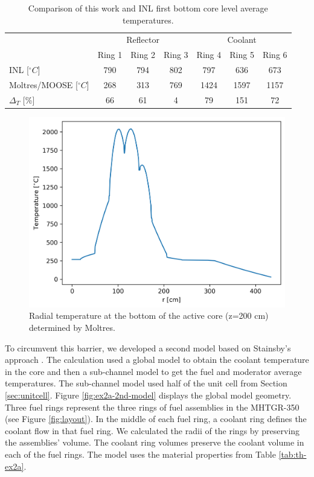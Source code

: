 \begin{table}[htbp!]
\centering
      \caption{Comparison of this work and INL \cite{strydom_inl_2013} first bottom core level average temperatures.}
      \label{tab:th-ex2a-1st-results}
\begin{tabular}{l|ccc|ccc}
    \toprule
                & \multicolumn{3}{c|}{Reflector} & \multicolumn{3}{c}{Coolant} \\ \cline{2-7} 
                & Ring 1   & Ring 2   & Ring 3   & Ring 4   & Ring 5  & Ring 6  \\
    \midrule
INL [$^{\circ}C$]           & 790    & 794     & 802     & 797     & 636     & 673     \\
Moltres/MOOSE [$^{\circ}C$] & 268    & 313     & 769     & 1424    & 1597    & 1157    \\
$\Delta_T$ [\%]    & 66       & 61     & 4       & 79      & 151     & 72      \\
    \bottomrule
  \end{tabular}
\end{table}

\begin{figure}[htbp!]
  \centering
  \includegraphics[width=0.45\linewidth]{figures-thermal/ex2a-across}
  \hfill
  \caption{Radial temperature at the bottom of the active core (z=200 cm) determined by Moltres.}
  \label{fig:ex2a-1st-model-across}
\end{figure}

To circumvent this barrier, we developed a second model based on Stainsby's approach \cite{stainsby_investigation_2008}.
The calculation used a global model to obtain the coolant temperature in the core and then a sub-channel model to get the fuel and moderator average temperatures.
The sub-channel model used half of the unit cell from Section \ref{sec:unitcell}.
Figure \ref{fig:ex2a-2nd-model} displays the global model geometry.
Three fuel rings represent the three rings of fuel assemblies in the MHTGR-350 (see Figure \ref{fig:layout}).
In the middle of each fuel ring, a coolant ring defines the coolant flow in that fuel ring.
We calculated the radii of the rings by preserving the assemblies' volume.
The coolant ring volumes preserve the coolant volume in each of the fuel rings.
The model uses the material properties from Table \ref{tab:th-ex2a}.

